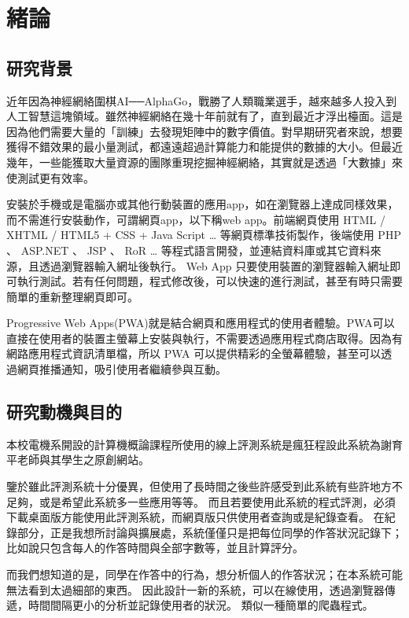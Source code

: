 \chapter{緒論}
\label{c:intro}
\section{研究背景} 

近年因為神經網絡圍棋AI──AlphaGo，戰勝了人類職業選手，越來越多人投入到人工智慧這塊領域。雖然神經網絡在幾十年前就有了，直到最近才浮出檯面。這是因為他們需要大量的「訓練」去發現矩陣中的數字價值。對早期研究者來說，想要獲得不錯效果的最小量測試，都遠遠超過計算能力和能提供的數據的大小。但最近幾年，一些能獲取大量資源的團隊重現挖掘神經網絡，其實就是透過「大數據」來使測試更有效率。\cite{name1}

安裝於手機或是電腦亦或其他行動裝置的應用app，如在瀏覽器上達成同樣效果，而不需進行安裝動作，可謂網頁app，以下稱web app。前端網頁使用 HTML / XHTML / HTML5 + CSS + Java Script … 等網頁標準技術製作，後端使用 PHP 、 ASP.NET 、 JSP 、 RoR … 等程式語言開發，並連結資料庫或其它資料來源，且透過瀏覽器輸入網址後執行。 Web App 只要使用裝置的瀏覽器輸入網址即可執行測試。若有任何問題，程式修改後，可以快速的進行測試，甚至有時只需要簡單的重新整理網頁即可。\cite{name2}

Progressive Web Apps(PWA)就是結合網頁和應用程式的使用者體驗。PWA可以直接在使用者的裝置主螢幕上安裝與執行，不需要透過應用程式商店取得。因為有網路應用程式資訊清單檔，所以 PWA 可以提供精彩的全螢幕體驗，甚至可以透過網頁推播通知，吸引使用者繼續參與互動。\cite{name3}


\section{研究動機與目的}

本校電機系開設的計算機概論課程所使用的線上評測系統是瘋狂程設\cite{name4}此系統為謝育平老師與其學生之原創網站。\cite{name5}

鑒於雖此評測系統十分優異，但使用了長時間之後些許感受到此系統有些許地方不足夠，或是希望此系統多一些應用等等。
而且若要使用此系統的程式評測，必須下載桌面版方能使用此評測系統，而網頁版只供使用者查詢或是紀錄查看。
在紀錄部分，正是我想所討論與擴展處，系統僅僅只是把每位同學的作答狀況記錄下；比如說只包含每人的作答時間與全部字數等，並且計算評分。

而我們想知道的是，同學在作答中的行為，想分析個人的作答狀況；在本系統可能無法看到太過細部的東西。
因此設計一新的系統，可以在線使用，透過瀏覽器傳遞，時間間隔更小的分析並記錄使用者的狀況。
類似一種簡單的爬蟲程式。\cite{name6}

